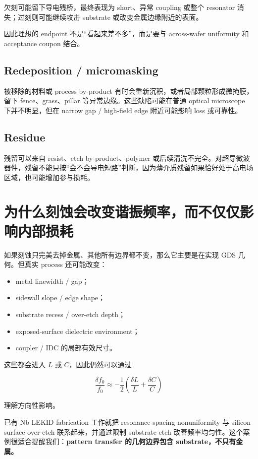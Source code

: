 欠刻可能留下导电残桥，最终表现为 short、异常 coupling 或整个 resonator 消失；过刻则可能继续攻击 substrate 或改变金属边缘附近的表面。

因此理想的 endpoint 不是“看起来差不多”，而是要与 across-wafer uniformity 和 acceptance coupon 结合。

\subsection{Redeposition / micromasking}

被移除的材料或 process by-product 有时会重新沉积，或者局部颗粒形成微掩膜，留下 fence、grass、pillar 等异常边缘。这些缺陷可能在普通 optical microscope 下并不明显，但在 narrow gap / high-field edge 附近可能影响 loss 或可靠性。

\subsection{Residue}

残留可以来自 resist、etch by-product、polymer 或后续清洗不完全。对超导微波器件，残留不能只按“会不会导电短路”判断，因为薄介质残留如果恰好处于高电场区域，也可能增加参与损耗。

\section{为什么刻蚀会改变谐振频率，而不仅仅影响内部损耗}

如果刻蚀只完美去掉金属、其他所有边界都不变，那么它主要是在实现 GDS 几何。但真实 process 还可能改变：

\begin{itemize}
  \item metal linewidth / gap；
  \item sidewall slope / edge shape；
  \item substrate recess / over-etch depth；
  \item exposed-surface dielectric environment；
  \item coupler / IDC 的局部有效尺寸。
\end{itemize}

这些都会进入 $L$ 或 $C$，因此仍然可以通过

\[
\frac{\delta f_0}{f_0}\approx
-\frac{1}{2}\left(\frac{\delta L}{L}+\frac{\delta C}{C}\right)
\]

理解方向性影响。

已有 Nb LEKID fabrication 工作就把 resonance-spacing nonuniformity 与 silicon surface over-etch 联系起来，并通过限制 substrate etch 改善频率均匀性。这个案例很适合提醒我们：\textbf{pattern transfer 的几何边界包含 substrate，不只有金属。}

